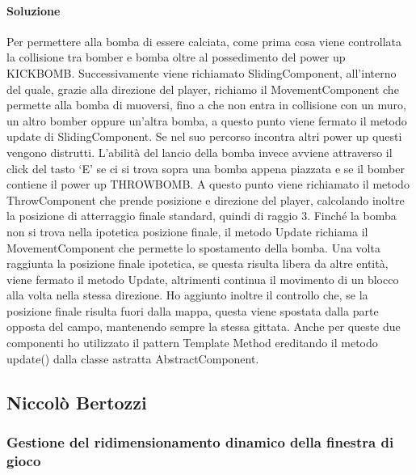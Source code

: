 \documentclass[a4paper,12pt]{report}
\begin{document}
\paragraph{Soluzione} Per permettere alla bomba di essere calciata, come prima cosa viene controllata la collisione tra bomber e bomba oltre al possedimento del power up KICKBOMB. Successivamente viene richiamato SlidingComponent, all’interno del quale, grazie alla direzione del player, richiamo il MovementComponent che permette alla bomba di muoversi, fino a che non entra in collisione con un muro, un altro bomber oppure un’altra bomba, a questo punto viene fermato il metodo update di SlidingComponent. Se nel suo percorso incontra altri power up questi vengono distrutti.
L’abilità del lancio della bomba invece avviene attraverso il click del tasto ‘E’ se ci si trova sopra una bomba appena piazzata e se il bomber contiene il power up THROWBOMB. A questo punto viene richiamato il metodo ThrowComponent che prende posizione e direzione del player, calcolando inoltre la posizione di atterraggio finale standard, quindi di raggio 3. Finché la bomba non si trova nella ipotetica posizione finale, il metodo Update richiama il MovementComponent che permette lo spostamento della bomba. Una volta raggiunta la posizione finale ipotetica, se questa risulta libera da altre entità, viene fermato il metodo Update, altrimenti continua il movimento di un blocco alla volta nella stessa direzione. Ho aggiunto inoltre il controllo che, se la posizione finale risulta fuori dalla mappa, questa viene spostata dalla parte opposta del campo, mantenendo sempre la stessa gittata.
Anche per queste due componenti ho utilizzato il pattern Template Method ereditando il metodo update() dalla classe astratta AbstractComponent.

\subsection*{Niccolò Bertozzi}

\subsubsection{Gestione del ridimensionamento dinamico della finestra di gioco}
\end{document}
